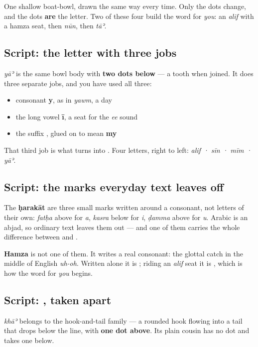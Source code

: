One shallow boat-bowl, drawn the same way every time. Only the dots change, and the dots \textbf{are} the letter. Two of these four build the word for \emph{you}: an \emph{alif} with a hamza seat, then \emph{nūn}, then \emph{tāʾ}.

\subsection*{Script: the letter with three jobs}
\textbf{} \emph{yāʾ} is the same bowl body with \textbf{two dots below} — a tooth when joined. It does three separate jobs, and you have used all three:

\begin{itemize}
\raggedright
  \item consonant \textbf{y}, as in \emph{yawm}, a day
  \item the long vowel \textbf{ī}, a seat for the \emph{ee} sound
  \item the suffix \textbf{}, glued on to mean \textbf{my}
\end{itemize}

That third job is what turns \textbf{} into \textbf{}. Four letters, right to left: \emph{alif · sīn · mīm · yāʾ}.

\subsection*{Script: the marks everyday text leaves off}
The \textbf{ḥarakāt} are three small marks written around a consonant, not letters of their own: \emph{fatḥa} above for \emph{a}, \emph{kasra} below for \emph{i}, \emph{ḍamma} above for \emph{u}. Arabic is an abjad, so ordinary text leaves them out — and one of them carries the whole difference between \textbf{} and \textbf{}.

\textbf{Hamza} is not one of them. It writes a real consonant: the glottal catch in the middle of English \emph{uh-oh}. Written alone it is \textbf{}; riding an \emph{alif} seat it is \textbf{}, which is how the word for \emph{you} begins.

\subsection*{Script: , taken apart}
\textbf{} \emph{khāʾ} belongs to the hook-and-tail family — a rounded hook flowing into a tail that drops below the line, with \textbf{one dot above}. Its plain cousin \textbf{} has no dot and \textbf{} takes one below.

